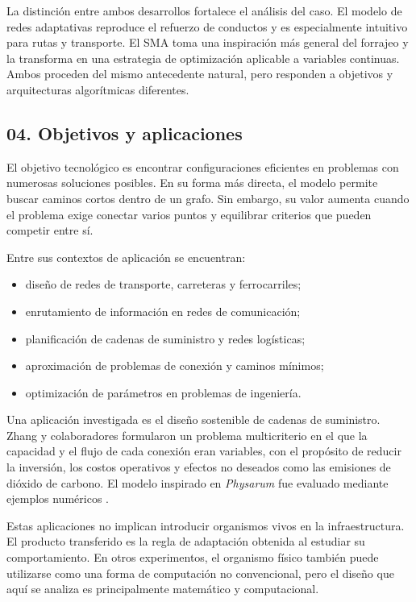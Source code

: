 \documentclass[11pt,letterpaper]{article}
\begin{document}
La distinción entre ambos desarrollos fortalece el análisis del caso. El modelo
de redes adaptativas reproduce el refuerzo de conductos y es especialmente
intuitivo para rutas y transporte. El SMA toma una inspiración más general del
forrajeo y la transforma en una estrategia de optimización aplicable a
variables continuas. Ambos proceden del mismo antecedente natural, pero
responden a objetivos y arquitecturas algorítmicas diferentes.

\subsection*{04. Objetivos y aplicaciones}

El objetivo tecnológico es encontrar configuraciones eficientes en problemas
con numerosas soluciones posibles. En su forma más directa, el modelo permite
buscar caminos cortos dentro de un grafo. Sin embargo, su valor aumenta cuando
el problema exige conectar varios puntos y equilibrar criterios que pueden
competir entre sí.

Entre sus contextos de aplicación se encuentran:

\begin{itemize}
  \item diseño de redes de transporte, carreteras y ferrocarriles;
  \item enrutamiento de información en redes de comunicación;
  \item planificación de cadenas de suministro y redes logísticas;
  \item aproximación de problemas de conexión y caminos mínimos;
  \item optimización de parámetros en problemas de ingeniería.
\end{itemize}

Una aplicación investigada es el diseño sostenible de cadenas de suministro.
Zhang y colaboradores formularon un problema multicriterio en el que la
capacidad y el flujo de cada conexión eran variables, con el propósito de
reducir la inversión, los costos operativos y efectos no deseados como las
emisiones de dióxido de carbono. El modelo inspirado en \emph{Physarum} fue
evaluado mediante ejemplos numéricos \parencite{zhang2017}.

Estas aplicaciones no implican introducir organismos vivos en la
infraestructura. El producto transferido es la regla de adaptación obtenida al
estudiar su comportamiento. En otros experimentos, el organismo físico también
puede utilizarse como una forma de computación no convencional, pero el diseño
que aquí se analiza es principalmente matemático y computacional.
\end{document}
